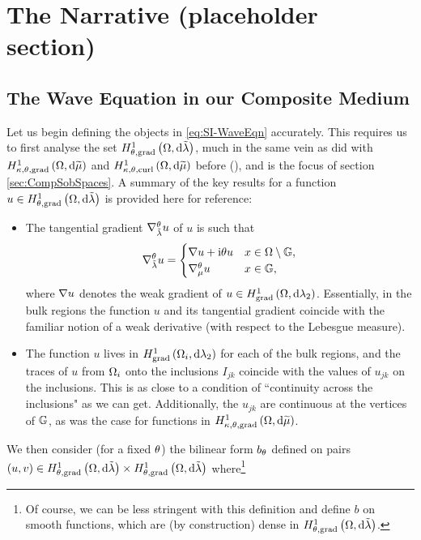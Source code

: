 \section{The Narrative (placeholder section)}

\subsection{The Wave Equation in our Composite Medium} \label{ssec:SI-WaveEqnSetup}
Let us begin defining the objects in \eqref{eq:SI-WaveEqn} accurately.
This requires us to first analyse the set $H^1_{\theta, \mathrm{grad}}\left( \Omega, \mathrm{d}\tilde{\lambda} \right)$, much in the same vein as did with $H^1_{\kappa,\theta,\mathrm{grad}}\left( \Omega, \mathrm{d}\widetilde{\mu} \right)$ and $H^1_{\kappa,\theta,\mathrm{curl}}\left( \Omega, \mathrm{d}\widetilde{\mu} \right)$ before (), and is the focus of section \ref{sec:CompSobSpaces}.
A summary of the key results for a function $u\in H^1_{\theta, \mathrm{grad}}\left( \Omega, \mathrm{d}\tilde{\lambda} \right)$ is provided here for reference:
\begin{itemize}
	\item The tangential gradient $\nabla^{\theta}_{\tilde{\lambda}}u$ of $u$ is such that
	\begin{align*}
		\nabla^{\theta}_{\tilde{\lambda}}u = \begin{cases} \nabla u + \mathrm{i}\theta u & x\in\Omega\setminus\mathbb{G}, \\ \nabla^{\theta}_{\mu}u & x\in\mathbb{G}, \end{cases}
	\end{align*}
	where $\nabla u$ denotes the weak gradient of $u\in H^1_\mathrm{grad}\left( \Omega, \mathrm{d}\lambda_2 \right)$.
	Essentially, in the bulk regions the function $u$ and its tangential gradient coincide with the familiar notion of a weak derivative (with respect to the Lebesgue measure).
	\item The function $u$ lives in $H^1_\mathrm{grad}\left( \Omega_i, \mathrm{d}\lambda_2 \right)$ for each of the bulk regions, and the traces of $u$ from $\Omega_i$ onto the inclusions $I_{jk}$ coincide with the values of $u_{jk}$ on the inclusions.
	This is as close to a condition of ``continuity across the inclusions" as we can get.
	Additionally, the $u_{jk}$ are continuous at the vertices of $\mathbb{G}$, as was the case for functions in $H^1_{\kappa,\theta,\mathrm{grad}}\left( \Omega, \mathrm{d}\widetilde{\mu} \right)$.
\end{itemize}
We then consider (for a fixed $\theta$) the bilinear form $b_{\theta}$ defined on pairs $(u,v)\in H^1_{\theta, \mathrm{grad}}\left( \Omega, \mathrm{d}\tilde{\lambda} \right)\times H^1_{\theta, \mathrm{grad}}\left( \Omega, \mathrm{d}\tilde{\lambda} \right)$ where\footnote{Of course, we can be less stringent with this definition and define $b$ on smooth functions, which are (by construction) dense in $H^1_{\theta, \mathrm{grad}}\left( \Omega, \mathrm{d}\tilde{\lambda} \right)$.}
